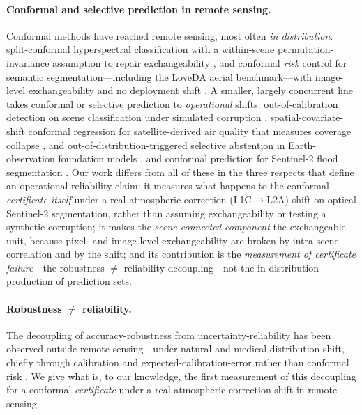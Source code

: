 \documentclass[preprint,3p,times]{elsarticle}
\begin{document}
\paragraph{Conformal and selective prediction in remote sensing.} Conformal methods have reached remote sensing, most often \emph{in distribution}: split-conformal hyperspectral classification with a within-scene permutation-invariance assumption to repair exchangeability \citep[SACP,][]{liu2024sacp}, and conformal \emph{risk} control for semantic segmentation---including the LoveDA aerial benchmark---with image-level exchangeability and no deployment shift \citep{mossina2024}. A smaller, largely concurrent line takes conformal or selective prediction to \emph{operational} shifts: out-of-calibration detection on scene classification under simulated corruption \citep{bhattacharjee2024}, spatial-covariate-shift conformal regression for satellite-derived air quality that measures coverage collapse \citep{adjei2026}, and out-of-distribution-triggered selective abstention in Earth-observation foundation models \citep{shrugfm2025}, and conformal prediction for Sentinel-2 flood segmentation \citep{floodconformal2025}. Our work differs from all of these in the three respects that define an operational reliability claim: it measures what happens to the conformal \emph{certificate itself} under a real atmospheric-correction (L1C$\to$L2A) shift on optical Sentinel-2 segmentation, rather than assuming exchangeability or testing a synthetic corruption; it makes the \emph{scene-connected component} the exchangeable unit, because pixel- and image-level exchangeability are broken by intra-scene correlation and by the shift; and its contribution is the \emph{measurement of certificate failure}---the robustness $\neq$ reliability decoupling---not the in-distribution production of prediction sets.

\paragraph{Robustness $\neq$ reliability.} The decoupling of accuracy-robustness from uncertainty-reliability has been observed outside remote sensing---under natural and medical distribution shift, chiefly through calibration and expected-calibration-error rather than conformal risk \citep{roschewitz2025,ovadia2019}. We give what is, to our knowledge, the first measurement of this decoupling for a conformal \emph{certificate} under a real atmospheric-correction shift in remote sensing.
\end{document}
